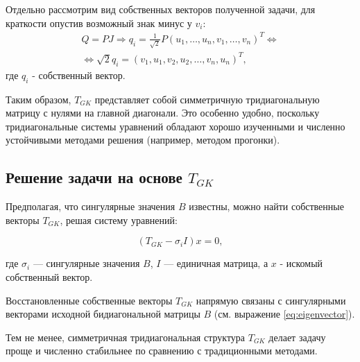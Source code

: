 Отдельно рассмотрим вид собственных векторов полученной задачи, для краткости опустив возможный знак минус у \(v_i\):
\begin{equation} \label{eq:eigenvector}
    \begin{split}
        Q=PJ \Rightarrow q_{i}=\frac{1}{\sqrt{2}}P(u_1,\dots,u_n,v_1,\dots,v_n)^T \Leftrightarrow \\[6pt]  \Leftrightarrow \sqrt{2}q_i=(v_1,u_1,v_2,u_2,\dots,v_n,u_n)^T, 
    \end{split}
\end{equation}
где \(q_i\) - собственный вектор.

Таким образом, \( T_{GK} \) представляет собой симметричную тридиагональную матрицу с нулями на главной диагонали. Это особенно удобно, поскольку тридиагональные системы уравнений обладают хорошо изученными и численно устойчивыми методами решения (например, методом прогонки).



\subsection{Решение задачи на основе \( T_{GK} \)}

Предполагая, что сингулярные значения \( B \) известны, можно найти собственные векторы \( T_{GK} \), решая систему уравнений:

\begin{equation}
( T_{GK} - \sigma_i I )x = 0,
\end{equation}

где \( \sigma_i \) — сингулярные значения \( B \), \( I \) — единичная матрица, а \(x\) - искомый собственный вектор.

Восстановленные собственные векторы \( T_{GK} \) напрямую связаны с сингулярными векторами исходной бидиагональной матрицы \( B \) (см. выражение \eqref{eq:eigenvector}).

Тем не менее, симметричная тридиагональная структура \( T_{GK} \) делает задачу проще и численно стабильнее по сравнению с традиционными методами.

